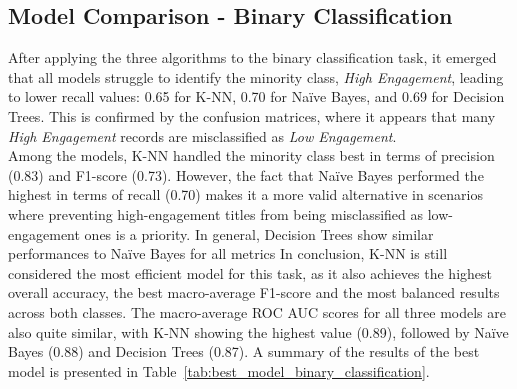 \subsection{Model Comparison - Binary Classification}
After applying the three algorithms to the binary classification task, it emerged that all models struggle to identify the minority class, 
\textit{High Engagement}, leading to lower recall values: 0.65 for K-NN, 0.70 for Naïve Bayes, and 0.69 for Decision Trees. 
This is confirmed by the confusion matrices, where it appears that many \textit{High Engagement} records are misclassified as \textit{Low Engagement}.\\

Among the models, K-NN handled the minority class best in terms of precision (0.83) and F1-score (0.73). 
However, the fact that Naïve Bayes performed the highest in terms of recall (0.70) makes it a more valid alternative in scenarios where preventing 
high-engagement titles from being misclassified as low-engagement ones is a priority. In general, Decision Trees show similar performances to Naïve Bayes for all metrics
In conclusion, K-NN is still considered the most efficient model for this task, as it also achieves the highest overall accuracy, 
the best macro-average F1-score and the most balanced results across both classes. 
The macro-average ROC AUC scores for all three models are also quite similar, with K-NN showing the highest value (0.89), 
followed by Naïve Bayes (0.88) and Decision Trees (0.87).
A summary of the results of the best model is presented in Table~\ref{tab:best_model_binary_classification}.

